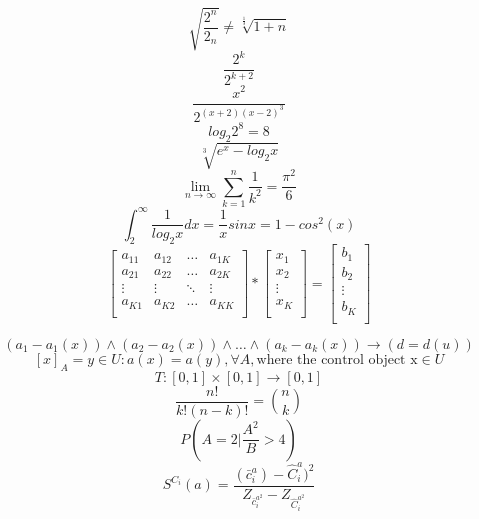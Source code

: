 \documentclass[12pt, letterpaper, titlepage]{article}
\begin{document}
\begin{center}
$$ \sqrt{ \frac{2^{n}}{2_n}} \neq \sqrt[\frac{1}{3}]{1+n} $$
$$ \frac{2^{k}}{2^{k+2}} $$
$$ \frac{x^{2}}{2^{(x+2)(x-2)^{3}}} $$
$$ log_2 2^8 = 8 $$
$$ \sqrt[3]{e^x - log_2 x} $$
$$ \lim_{n \to \infty} \sum_{k=1}^{n} \frac{1}{k^{2}} = \frac{\pi^2}{6} $$
$$ \int_{2}^{\infty} \frac{1}{log_2 x} dx = \frac{1}{x} sin  x = 1 - cos^2 (x) $$
$$ \mathbf{}
\left[ \begin{array}{cccc}
a_{11} & a_{12} & \ldots & a_{1K} \\
a_{21} & a_{22} & \ldots & a_{2K} \\
\vdots & \vdots & \ddots & \vdots \\
a_{K1} & a_{K2} & \ldots & a_{KK} \\
\end{array} \right] * 
\left[ \begin{array}{c}
x_{1} \\
x_{2} \\
\vdots \\
x_{K} \\
\end{array} \right] = 
\left[ \begin{array}{c}
b_{1} \\
b_{2} \\
\vdots \\
b_{K} \\
\end{array} \right]$$



$$ (a_1 - a_1(x)) \land (a_2 - a_2(x)) \land \ldots \land (a_k - a_k(x)) \rightarrow (d = d(u)) $$
$$ [x]_A = {y \in U : a(x) = a(y), \forall A }, \text{where the control object x} \in U $$ 
$$ T : [0,1] \times [0,1] \to [0,1] $$
$$ \frac{n!}{k!(n-k)!} = {n \choose k} $$ 
$$ P \left( A = 2 \bigg| \frac{A^{2}}{B} > 4 \right) $$
$$ S^{C_i} (a) = \frac{(\bar{c}^a_i) - \hat{C}^a_i)^2}{Z_{\bar{c}_i^{a^2}} - Z_{\hat{C}_i^{a^2}}} $$
\end{center}
\end{document}
